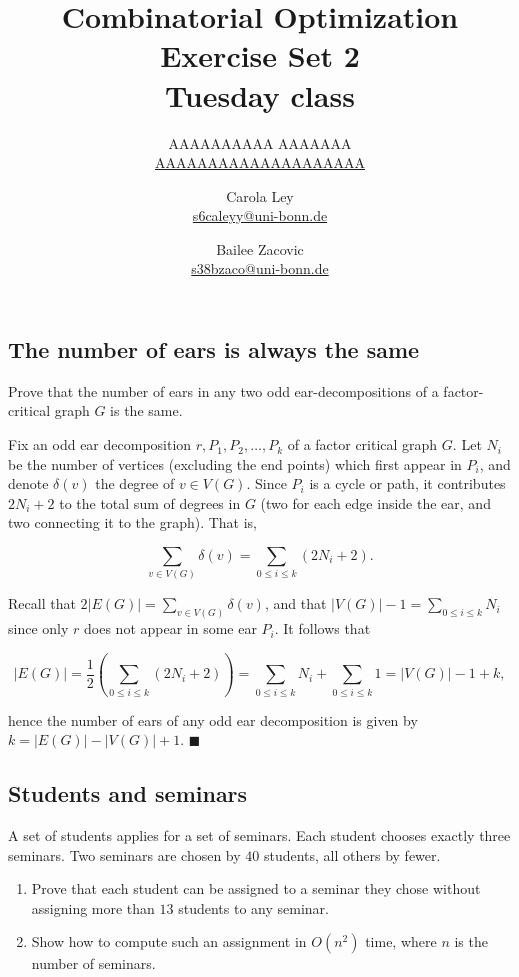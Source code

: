 \documentclass{article}
\title{Combinatorial Optimization \\ Exercise Set 2 \\ Tuesday class}
\author{
  AAAAAAAAAA AAAAAAA \\
  \href{mailto:AAAAAAAAAAAAAAAAAAAA}{AAAAAAAAAAAAAAAAAAAA}
  \and
  Carola Ley \\
  \href{mailto:s6caleyy@uni-bonn.de}{s6caleyy@uni-bonn.de}
  \and
  Bailee Zacovic \\
  \href{mailto:s38bzaco@uni-bonn.de}{s38bzaco@uni-bonn.de}
}
\begin{document}
  \maketitle

  \setcounter{section}{2}
  \subsection{The number of ears is always the same}
  \begin{centerframebox}
    Prove that the number of ears in any two odd ear-decompositions of a factor-critical graph $G$ is the same.
  \end{centerframebox}

Fix an odd ear decomposition $r, P_1, P_2, \dots, P_k$ of a factor critical graph $G.$ Let $N_i$ be the number of vertices (excluding the end points) which first appear in $P_i$, and denote $\delta(v)$ the degree of $v\in V(G)$. Since $P_i$ is a cycle or path, it contributes $2N_i+2$ to the total sum of degrees in $G$ (two for each edge inside the ear, and two connecting it to the graph). That is,

$$\sum_{v\in V(G)} \delta(v)=\sum_{0\leq i\leq k} (2N_i+2).$$

Recall that $2|E(G)|=\sum_{v\in V(G)} \delta(v)$, and that $|V(G)|-1=\sum_{0\leq i\leq k} N_i $ since only $r$ does not appear in some ear $P_i$. It follows that

$$|E(G)|=\frac{1}{2}\left(\sum_{0\leq i\leq k} (2N_i+2)\right)=\sum_{0\leq i\leq k} N_i+\sum_{0\leq i\leq k}1=|V(G)|-1+k,$$

hence the number of ears of any odd ear decomposition is given by $k=|E(G)|-|V(G)|+1.$ $\blacksquare$

  \subsection{Students and seminars}
  \begin{centerframebox}
    A set of students applies for a set of seminars. Each student chooses
    exactly three seminars. Two seminars are chosen by $40$ students, all others by
    fewer.

    \begin{enumerate}[label=(\alph*)]
      \item
      Prove that each student can be assigned to a seminar they chose without
      assigning more than $13$ students to any seminar.

      \item
      Show how to compute such an assignment in $O(n^2)$ time, where $n$ is the number of seminars.
    \end{enumerate}

  \end{centerframebox}
\end{document}
